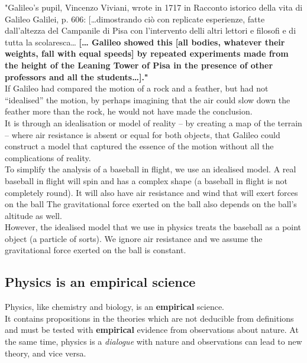 \documentclass[11pt]{article}
\begin{document}
"Galileo’s pupil, Vincenzo Viviani, wrote in 1717 in Racconto istorico della vita di Galileo Galilei, p. 606: [\ldots{}dimostrando ciò con replicate esperienze, fatte dall'altezza del Campanile di Pisa con l'intervento delli altri lettori e filosofi e di tutta la scolaresca\ldots{} \textbf{[\ldots{} Galileo showed this [all bodies, whatever their weights, fall with equal speeds] by repeated experiments made from the height of the Leaning Tower of Pisa in the presence of other professors and all the students\ldots{}]."}
\\[0pt]

If Galileo had compared the motion of a rock and a feather, but had not “idealised” the motion, by perhaps imagining that the air could slow down the feather more than the rock, he would not have made the conclusion.
\\[0pt]

It is through an idealisation or model of reality – by creating a map of the terrain – where air resistance is absent or equal for both objects, that Galileo could construct a model that captured the essence of the motion without all the complications of reality.
\\[0pt]

To simplify the analysis of a baseball in flight, we use an idealised model. A real baseball in flight will spin and has a complex shape (a baseball in flight is not completely round). It will also have air resistance and wind that will exert forces on the ball The gravitational force exerted on the ball also depends on the ball's altitude as well.
\\[0pt]

However, the idealised model that we use in physics treats the baseball as a point object (a particle of sorts). We ignore air resistance and we assume the gravitational force exerted on the ball is constant.

\newpage

\subsection{Physics is an empirical science}
\label{sec:org8018d46}
Physics, like chemistry and biology, is an \textbf{empirical} science.
\\[0pt]

It contains propositions in the theories which are not deducible from definitions and must be tested with \textbf{empirical} evidence from observations about nature. At the same time, physics is a \emph{dialogue} with nature and observations can lead to new theory, and vice versa.
\end{document}
